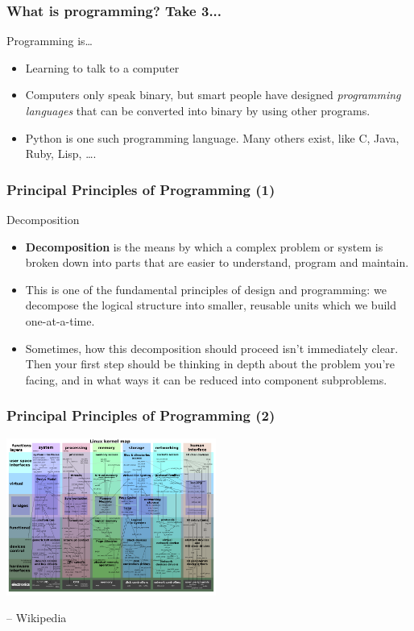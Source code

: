 \documentclass[10pt]{beamer}
\begin{document}
\begin{frame}
  \frametitle{What is programming? Take 3...}
	\begin{block}{Programming is\ldots}
		\begin{itemize}
		\item Learning to talk to a computer
		\item Computers only speak binary, but smart people have designed \textit{programming languages} that can be converted into binary by using other programs.
		\item Python is one such programming language. Many others exist, like C, Java, Ruby, Lisp, \ldots.
		\end{itemize}
	\end{block}
\end{frame}

\begin{frame}
  \frametitle{Principal Principles of Programming (1)}
  \begin{block}{Decomposition}
    \begin{itemize}
      \item \textbf{Decomposition} is the means by which a complex problem or system is broken down into parts that are easier to understand, program and maintain.
      \item This is one of the fundamental principles of design and programming: we decompose the logical structure into smaller, reusable units which we build one-at-a-time.
      \item Sometimes, how this decomposition should proceed isn't immediately clear.
        Then your first step should be thinking in depth about the problem you're facing, and in what ways it can be reduced into component subproblems.
    \end{itemize}
  \end{block}
\end{frame}

\begin{frame}
  \frametitle{Principal Principles of Programming (2)}
  \centering
  \includegraphics[width=260px]{LinuxKernelMap.png}
  \begin{flushright} 
    \footnotesize -- Wikipedia
  \end{flushright}
\end{frame}
\end{document}
